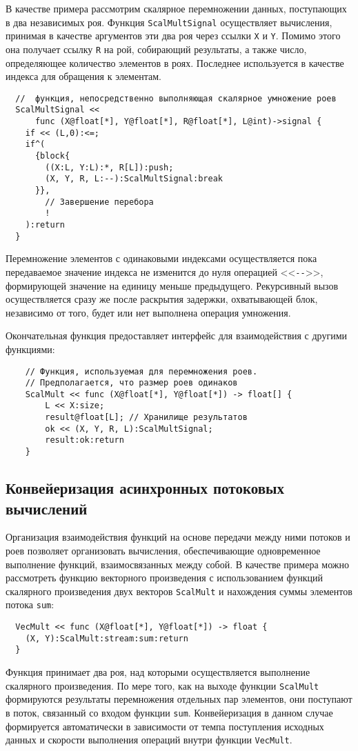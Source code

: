 В качестве примера рассмотрим скалярное перемножении данных, поступающих в два независимых роя. Функция \texttt{ScalMultSignal} осуществляет вычисления, принимая в качестве аргументов эти  два роя через ссылки \texttt{X} и \texttt{Y}. Помимо этого она получает ссылку \texttt{R} на рой, собирающий результаты, а также число, определяющее количество элементов в роях. Последнее используется в качестве индекса для обращения к элементам.
\begin{verbatim}
  //  функция, непосредственно выполняющая скалярное умножение роев
  ScalMultSignal <<
      func (X@float[*], Y@float[*], R@float[*], L@int)->signal {
    if << (L,0):<=;
    if^(
      {block{
        ((X:L, Y:L):*, R[L]):push;
        (X, Y, R, L:--):ScalMultSignal:break
      }},
        // Завершение перебора
        !
    ):return
  }
\end{verbatim}
Перемножение элементов с одинаковыми индексами осуществляется пока передаваемое значение индекса не изменится до нуля операцией <<\verb|--|>>, формирующей значение на единицу меньше предыдущего. Рекурсивный вызов осуществляется сразу же после раскрытия задержки, охватывающей блок, независимо от того, будет или нет выполнена операция умножения.

Окончательная функция предоставляет интерфейс для взаимодействия с другими функциями:
\begin{verbatim}
    // Функция, используемая для перемножения роев.
    // Предполагается, что размер роев одинаков
    ScalMult << func (X@float[*], Y@float[*]) -> float[] {
        L << X:size;
        result@float[L]; // Хранилище результатов
        ok << (X, Y, R, L):ScalMultSignal;
        result:ok:return
    }
\end{verbatim}

\subsection{Конвейеризация асинхронных потоковых вычислений}

Организация взаимодействия функций на основе передачи между ними потоков и роев позволяет организовать вычисления, обеспечивающие одновременное выполнение функций, взаимосвязанных между собой. В качестве примера можно рассмотреть функцию векторного произведения с использованием функций скалярного произведения двух векторов \texttt{ScalMult} и нахождения суммы элементов потока \texttt{sum}:
\begin{verbatim}
  VecMult << func (X@float[*], Y@float[*]) -> float {
    (X, Y):ScalMult:stream:sum:return
  }
\end{verbatim}
Функция принимает два роя, над которыми осуществляется выполнение скалярного произведения. По мере того, как на выходе функции \texttt{ScalMult} формируются результаты перемножения отдельных пар элементов, они поступают в поток, связанный со входом функции \texttt{sum}. Конвейеризация в данном случае формируется автоматически в зависимости от темпа поступления исходных данных и скорости выполнения операций внутри функции \texttt{VecMult}.

